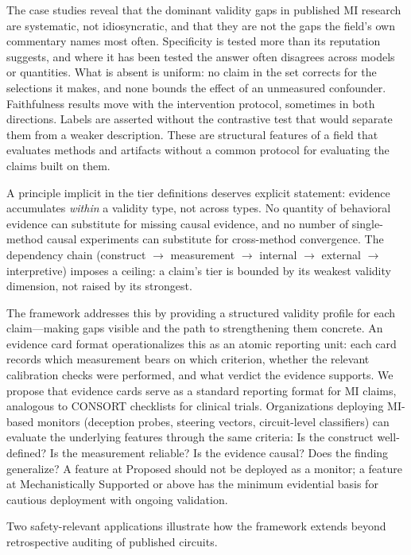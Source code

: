 \documentclass{article}
\begin{document}
The case studies reveal that the dominant validity gaps in published MI research are systematic, not idiosyncratic, and that they are not the gaps the field's own commentary names most often. Specificity is tested more than its reputation suggests, and where it has been tested the answer often disagrees across models or quantities. What is absent is uniform: no claim in the set corrects for the selections it makes, and none bounds the effect of an unmeasured confounder. Faithfulness results move with the intervention protocol, sometimes in both directions. Labels are asserted without the contrastive test that would separate them from a weaker description. These are structural features of a field that evaluates methods and artifacts without a common protocol for evaluating the claims built on them.

A principle implicit in the tier definitions deserves explicit statement: evidence accumulates \emph{within} a validity type, not across types.  No quantity of behavioral evidence can substitute for missing causal evidence, and no number of single-method causal experiments can substitute for cross-method convergence.  The dependency chain (construct $\to$ measurement $\to$ internal $\to$ external $\to$ interpretive) imposes a ceiling: a claim's tier is bounded by its weakest validity dimension, not raised by its strongest.

The framework addresses this by providing a structured validity profile for each claim---making gaps visible and the path to strengthening them concrete. An evidence card format operationalizes this as an atomic reporting unit: each card records which measurement bears on which criterion, whether the relevant calibration checks were performed, and what verdict the evidence supports. We propose that evidence cards serve as a standard reporting format for MI claims, analogous to CONSORT checklists for clinical trials. Organizations deploying MI-based monitors (deception probes, steering vectors, circuit-level classifiers) can evaluate the underlying features through the same criteria: Is the construct well-defined? Is the measurement reliable? Is the evidence causal? Does the finding generalize? A feature at Proposed should not be deployed as a monitor; a feature at Mechanistically Supported or above has the minimum evidential basis for cautious deployment with ongoing validation.

Two safety-relevant applications illustrate how the framework extends beyond retrospective auditing of published circuits.
\end{document}
